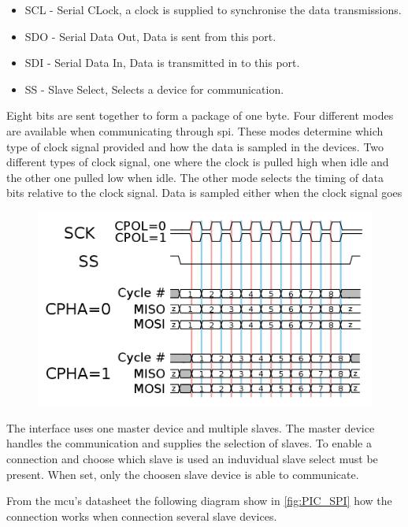 \begin{itemize}[noitemsep]
	\item SCL - Serial CLock, a clock is supplied to synchronise the data transmissions.
	\item SDO - Serial Data Out, Data is sent from this port.
	\item SDI - Serial Data In, Data is transmitted in to this port.
	\item SS - Slave Select, Selects a device for communication.
\end{itemize}
 
Eight bits are sent together to form a package of one byte. Four different modes are available when communicating through \gls{spi}. These modes determine which type of clock signal provided and how the data is sampled in the devices. Two different types of clock signal, one where the clock is pulled high when idle and the other one pulled low when idle. 
The other mode selects the timing of data bits relative to the clock signal. Data is sampled either when the clock signal goes 


\begin{figure}[H]
	\centering
    \includegraphics[width=.8\linewidth]{Figures/SPI_timing}
	\label{fig:SPI_timing}
\end{figure}


The interface uses one master device and multiple slaves. The master device handles the communication and supplies the selection of slaves. To enable a connection and choose which slave is used an induvidual slave select must be present. When set, only the choosen slave device is able to communicate.

From the \gls{mcu}'s datasheet the following diagram show in \autoref{fig:PIC_SPI} how the connection works when connection several slave devices.

